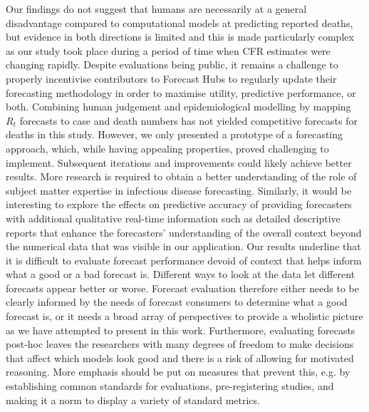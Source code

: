 \documentclass[10pt,a4paper,twocolumn]{article}
\begin{document}
Our findings do not suggest that humans are necessarily at a general disadvantage compared to computational models at predicting reported deaths, but evidence in both directions is limited and this is made particularly complex as our study took place during a period of time when CFR estimates were changing rapidly. Despite evaluations being public, it remains a challenge to properly incentivise contributors to Forecast Hubs to regularly update their forecasting methodology in order to maximise utility, predictive performance, or both. Combining human judgement and epidemiological modelling by mapping $R_t$ forecasts to case and death numbers has not yielded competitive forecasts for deaths in this study. However, we only presented a prototype of a forecasting approach, which, while having appealing properties, proved challenging to implement. Subsequent iterations and improvements could likely achieve better results. More research is required to obtain a better understanding of the role of subject matter expertise in infectious disease forecasting. Similarly, it would be interesting to explore the effects on predictive accuracy of providing forecasters with additional qualitative real-time information such as detailed descriptive reports that enhance the forecasters' understanding of the overall context beyond the numerical data that was visible in our application.
Our results underline that it is difficult to evaluate forecast performance devoid of context that helps inform what a good or a bad forecast is. Different ways to look at the data let different forecasts appear better or worse. Forecast evaluation therefore either needs to be clearly informed by the needs of forecast consumers to determine what a good forecast is, or it needs a broad array of perspectives to provide a wholistic picture as we have attempted to present in this work. Furthermore, evaluating forecasts post-hoc leaves the researchers with many degrees of freedom to make decisions that affect which models look good and there is a risk of allowing for motivated reasoning. More emphasis should be put on measures that prevent this, e.g. by establishing common standards for evaluations, pre-registering studies, and making it a norm to display a variety of standard metrics. 
\end{document}
